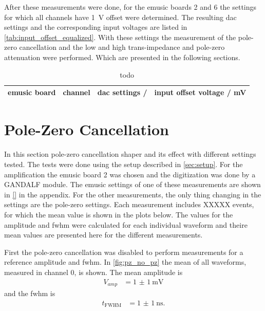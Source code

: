 After these measurements were done, for the \ac{emusic} boards 2 and 6 the settings for which all channels have \SI{1}{\volt} offset were determined.
The resulting \ac{dac} settings and the corresponding input voltages are listed in \autoref{tab:input_offset_equalized}.
With these settings the measurement of the pole-zero cancellation and the low and high trans-impedance and pole-zero attenuation were performed.
Which are presented in the following sections.
\begin{table}
	\centering
	\caption[todo]{todo}
	\label{tab:input_offset_equalized}
	\begin{tabular}{|c|c|c|c|}
	    \ac{emusic} board & channel & \ac{dac} settings / \si{\dacu} & input offset voltage / \si{\milli\volt} \\\hline
	\end{tabular}
\end{table}

\section{Pole-Zero Cancellation}

In this section pole-zero cancellation shaper and its effect with different settings tested.
The tests were done using the setup described in \autoref{sec:setup}.
For the amplification the \ac{emusic} board 2 was chosen and the digitization was done by a GANDALF module.
The \ac{emusic} settings of one of these measurements are shown in \autoref{} in the appendix.
For the other measurements, the only thing changing in the settings are the pole-zero settings.
Each measurement includes XXXXX events, for which the mean value is shown in the plots below.
The values for the amplitude and \ac{fwhm} were calculated for each individual waveform and theire mean values are presented here for the different measurements.

First the pole-zero cancellation was disabled to perform measurements for a reference amplitude and \ac{fwhm}.
In \autoref{fig:pz_no_pz} the mean of all waveforms, measured in channel 0, is shown.
The mean amplitude is 
\begin{align}
    V_{amp} &= \SI{1(1)}{\milli\volt}
\end{align}
and the \ac{fwhm} is
\begin{align}
    t_\text{FWHM} &= \SI{1(1)}{\nano\second}.
\end{align}


